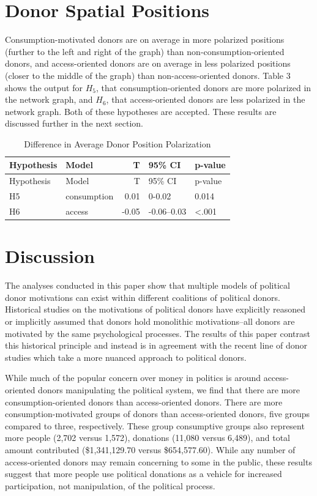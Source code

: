\documentclass[12pt,]{article}
\begin{document}
\hypertarget{donor-spatial-positions}{%
\section{Donor Spatial Positions}\label{donor-spatial-positions}}

Consumption-motivated donors are on average in more polarized positions
(further to the left and right of the graph) than
non-consumption-oriented donors, and access-oriented donors are on
average in less polarized positions (closer to the middle of the graph)
than non-access-oriented donors. Table 3 shows the output for \(H_{5}\),
that consumption-oriented donors are more polarized in the network
graph, and \(H_{6}\), that access-oriented donors are less polarized in
the network graph. Both of these hypotheses are accepted. These results
are discussed further in the next section.

\begin{longtable}[]{@{}llrll@{}}
\caption{Difference in Average Donor Position
Polarization}\tabularnewline
\toprule
Hypothesis & Model & T & 95\% CI & p-value\tabularnewline
\midrule
\endfirsthead
\toprule
Hypothesis & Model & T & 95\% CI & p-value\tabularnewline
\midrule
\endhead
H5 & consumption & 0.01 & 0-0.02 & 0.014\tabularnewline
H6 & access & -0.05 & -0.06--0.03 & \textless.001\tabularnewline
\bottomrule
\end{longtable}

\hypertarget{discussion}{%
\section{Discussion}\label{discussion}}

The analyses conducted in this paper show that multiple models of
political donor motivations can exist within different coalitions of
political donors. Historical studies on the motivations of political
donors have explicitly reasoned or implicitly assumed that donors hold
monolithic motivations--all donors are motivated by the same
psychological processes. The results of this paper contrast this
historical principle and instead is in agreement with the recent line of
donor studies which take a more nuanced approach to political donors.

While much of the popular concern over money in politics is around
access-oriented donors manipulating the political system, we find that
there are more consumption-oriented donors than access-oriented donors.
There are more consumption-motivated groups of donors than
access-oriented donors, five groups compared to three, respectively.
These group consumptive groups also represent more people (2,702 versus
1,572), donations (11,080 versus 6,489), and total amount contributed
(\$1,341,129.70 versus \$654,577.60). While any number of
access-oriented donors may remain concerning to some in the public,
these results suggest that more people use political donations as a
vehicle for increased participation, not manipulation, of the political
process.
\end{document}
